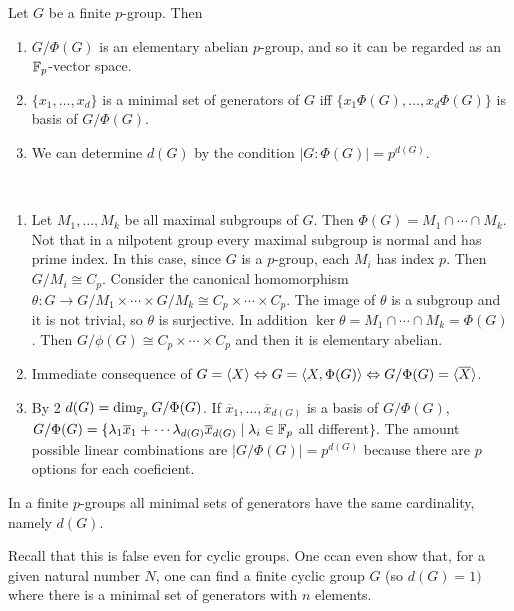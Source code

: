 \documentclass[twoside, 11pt]{article}
\begin{document}
\begin{teorema}
Let $G$ be a finite $p$-group. Then
\begin{enumerate}
\item $G/\Phi(G)$ is an elementary abelian $p$-group, and so it can be regarded as an $\mathbb{F}_p$-vector space. 
\item $\{x_1,\dots, x_d\}$ is a minimal set of generators of $G$ iff $\{x_1\Phi(G),\dots, x_d\Phi(G)\}$ is basis of $G/\Phi(G)$. 
\item We can determine $d(G)$ by the condition $|G:\Phi(G)|=p^{d(G)}$. 
\end{enumerate}
\end{teorema}
\begin{dem}\
\begin{enumerate}
\item Let $M_1,\dots,M_k$ be all maximal subgroups of $G$. Then $\Phi(G)=M_1\cap\cdots\cap M_k$. Not that in a nilpotent group every maximal subgroup is normal and has prime index. In this case, since $G$ is a $p$-group, each $M_i$ has index $p$. Then $G/M_i\cong C_p$. Consider the canonical homomorphism $\theta:G\to G/M_1\times\cdots\times G/M_k\cong C_p\times\cdots\times C_p$. The image of $\theta$ is a subgroup and it is not trivial, so $\theta$ is surjective. In addition $\ker\theta=M_1\cap\cdots\cap M_k=\Phi(G)$. Then $G/\phi(G)\cong C_p\times\cdots\times C_p$ and then it is elementary abelian. 

\item Immediate consequence of $G=\langle{X}\rangle\Leftrightarrow G=\langle{X,\Phi(G)}\rangle\Leftrightarrow G/\Phi(G)=\langle{\overline{X}}\rangle$. 

\item By 2 $d(G)=\dim_{\mathbb{F}_p}G/\Phi(G)$. If $\overline{x}_1,\dots, \overline{x}_{d(G)}$ is a basis of $G/\Phi(G)$, $G/\Phi(G)=\{\lambda_1 \overline{x}_1+\cdots \lambda_{d(G)}\overline{x}_{d(G)}\mid \lambda_i\in\mathbb{F}_p$ all different$\}$. The amount possible linear combinations are $|G/\Phi(G)|=p^{d(G)}$ because there are $p$ options for each coeficient. 
\end{enumerate}
\end{dem}

\begin{coro}
In a finite $p$-groups all minimal sets of generators have the same cardinality, namely $d(G)$. 
\end{coro}

Recall that this is false even for cyclic groups. One ccan even show that, for a given natural number $N$, one can find a finite cyclic group $G$ (so $d(G)=1)$ where there is a minimal set of generators with $n$ elements. 
\end{document}
